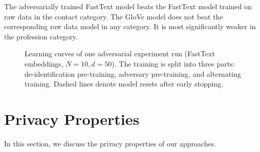 \begin{description}
    The adversarially trained FastText model beats the FastText model trained on raw data in the contact category. 
    The GloVe model does not beat the corresponding raw data model in any category.
    It is most significantly weaker in the profession category.
\end{description}

\begin{figure*}
    \centering
    
    \caption{Learning curves of one adversarial experiment run (FastText embeddings, $N=10, d=50$).
        The training is split into three parts: de-identification pre-training, adversary pre-training, and alternating training.
        Dashed lines denote model resets after early stopping.}\label{fig:adversarial-learning-curves}
\end{figure*}

\section{Privacy Properties}
%
In this section, we discuss the privacy properties of our approaches.

